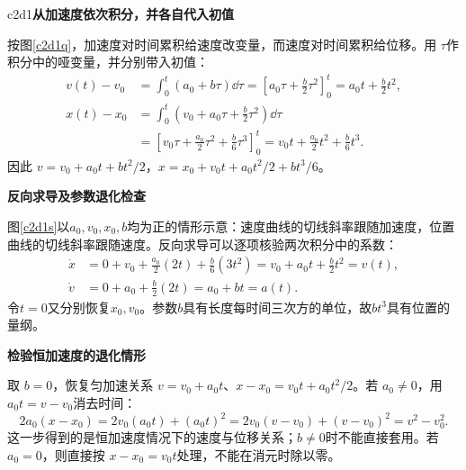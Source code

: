\LectureAnswerSection

\begin{drillsolution}{c2d1}\textbf{从加速度依次积分，并各自代入初值}\par\nobreak
按图\ref{c2d1q}，加速度对时间累积给速度改变量，而速度对时间累积给位移。用 $\tau$作积分中的哑变量，并分别带入初值：
\begin{align*}
v(t)-v_0&=\int_0^t(a_0+b\tau)\dd\tau
 =\left[a_0\tau+\frac b2\tau^2\right]_0^t
 =a_0t+\frac b2t^2,\\
x(t)-x_0&=\int_0^t\left(v_0+a_0\tau+\frac b2\tau^2\right)\dd\tau\\
&=\left[v_0\tau+\frac{a_0}{2}\tau^2+\frac b6\tau^3\right]_0^t
=v_0t+\frac{a_0}2t^2+\frac b6t^3.
\end{align*}
因此 $v=v_0+a_0t+bt^2/2$，$x=x_0+v_0t+a_0t^2/2+bt^3/6$。



\par\medskip{}\noindent\textbf{反向求导及参数退化检查}\par\nobreak
图\ref{c2d1s}以$a_0,v_0,x_0,b$均为正的情形示意：速度曲线的切线斜率跟随加速度，位置曲线的切线斜率跟随速度。反向求导可以逐项核验两次积分中的系数：
\begin{align*}
\dot x&=0+v_0+\frac{a_0}{2}(2t)+\frac b6(3t^2)
=v_0+a_0t+\frac b2t^2=v(t),\\
\dot v&=0+a_0+\frac b2(2t)=a_0+bt=a(t).
\end{align*}
令$t=0$又分别恢复$x_0,v_0$。参数$b$具有长度每时间三次方的单位，故$bt^3$具有位置的量纲。


\par\medskip{}\noindent\textbf{检验恒加速度的退化情形}\par\nobreak
取 $b=0$，恢复匀加速关系 $v=v_0+a_0t$、$x-x_0=v_0t+a_0t^2/2$。若 $a_0\ne0$，用 $a_0t=v-v_0$消去时间：
\[2a_0(x-x_0)=2v_0(a_0t)+(a_0t)^2
 =2v_0(v-v_0)+(v-v_0)^2=v^2-v_0^2.\]
这一步得到的是恒加速度情况下的速度与位移关系；$b\ne0$时不能直接套用。若 $a_0=0$，则直接按 $x-x_0=v_0t$处理，不能在消元时除以零。



\end{drillsolution}
